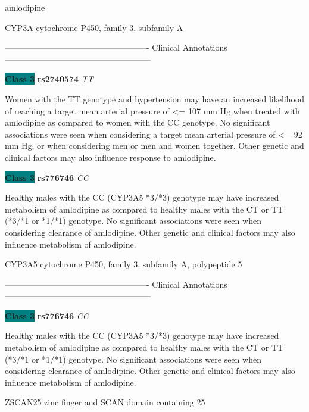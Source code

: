 \documentclass{resume} %
\begin{document}
\begin{rSection}{ amlodipine }
\begin{rSubsection}{ CYP3A }{ cytochrome P450, family 3, subfamily A }{}{}
\item[] ---------------------------------------------------- Clinical Annotations -----------------------------------------------------\newline
\item \textbf{\colorbox{teal} {Class 3}} \textbf{ rs2740574 } \textit{ TT }
\item[] Women with the TT genotype and hypertension may have an increased likelihood of reaching a target mean arterial pressure of <= 107 mm Hg when treated with amlodipine as compared to women with the CC genotype. No significant associations were seen when considering a target mean arterial pressure of <= 92 mm Hg, or when considering men or men and women together. Other genetic and clinical factors may also influence response to amlodipine.\item \textbf{\colorbox{teal} {Class 3}} \textbf{ rs776746 } \textit{ CC }
\item[] Healthy males with the CC (CYP3A5 *3/*3) genotype may have increased metabolism of amlodipine as compared to healthy males with the CT or TT (*3/*1 or *1/*1) genotype. No significant associations were seen when considering clearance of amlodipine. Other genetic and clinical factors may also influence metabolism of amlodipine.
\end{rSubsection}\begin{rSubsection}{ CYP3A5 }{ cytochrome P450, family 3, subfamily A, polypeptide 5 }{}{}
\item[]

\item[] ---------------------------------------------------- Clinical Annotations -----------------------------------------------------\newline
\item \textbf{\colorbox{teal} {Class 3}} \textbf{ rs776746 } \textit{ CC }
\item[] Healthy males with the CC (CYP3A5 *3/*3) genotype may have increased metabolism of amlodipine as compared to healthy males with the CT or TT (*3/*1 or *1/*1) genotype. No significant associations were seen when considering clearance of amlodipine. Other genetic and clinical factors may also influence metabolism of amlodipine.
\end{rSubsection}\begin{rSubsection}{ ZSCAN25 }{ zinc finger and SCAN domain containing 25 }{}{}
\item[]


\end{rSubsection}
\end{rSection}
\end{document}
